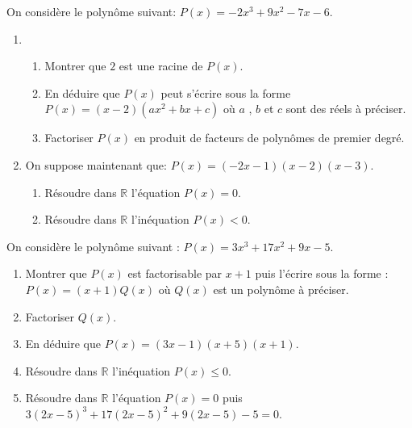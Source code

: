 \begin{exercice}
On considère le polynôme  suivant:\; $ P(x)=-2x^3+9x^2-7x-6 $.
\begin{enumerate}
\item 
\begin{enumerate}
\item Montrer que $ 2 $ est une racine de  $ P(x)$. 

\item En déduire que $ P(x) $ peut s'écrire sous la forme  \; $  P(x)=(x-2)(ax^2+bx+c)$ où $a $ , $b $ et $ c $ sont des réels à préciser.
\item Factoriser  $ P(x)$ en produit de facteurs de polynômes de premier degré.
\end{enumerate}

\item On suppose maintenant que:\; \; $ P(x)=(-2x-1)(x-2)(x-3) $.
\begin{enumerate}
\item Résoudre dans $ \mathbb{R} $ l'équation \; $ P(x)=0$. 
\item Résoudre dans $ \mathbb{R} $ l'inéquation\; $ P(x) <0 $. 
\end{enumerate}
\end{enumerate}
\end{exercice}

\begin{exercice}
On considère le  polynôme  suivant :  $ P(x)=3x^3+17x^2+9x-5 $.
\begin{enumerate}
\item Montrer que $P(x)$ est factorisable par $ x+1 $ puis l'écrire sous la forme   :\; $ P(x)=(x+1)Q(x) $ où  $Q(x)$ est un  polynôme à préciser.
\item Factoriser $Q(x)$.
\item En déduire que $P(x)=(3x-1)(x+5)(x+1)$.
\item Résoudre dans $ \mathbb{R} $ l'inéquation \; $ P(x)\leq 0 $.
\item Résoudre dans $ \mathbb{R} $ l'équation\; $ P(x)=0 $\;  puis\;  $ 3(2x-5)^3+17(2x-5)^2+9(2x-5)-5=0$. 
\end{enumerate}
\end{exercice}

